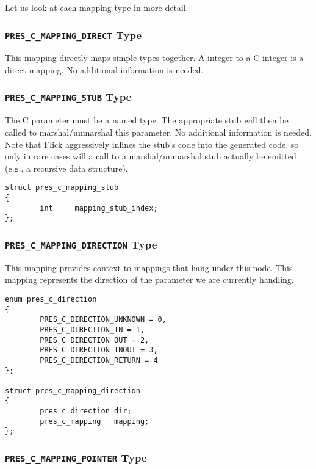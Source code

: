 Let us look at each mapping type in more detail.

\subsubsection{\texttt{PRES\_C\_MAPPING\_DIRECT} Type}

This mapping directly maps simple types together.  A \MINT{} integer to a C
integer is a direct mapping.  No additional information is needed.

\subsubsection{\texttt{PRES\_C\_MAPPING\_STUB} Type}

The C parameter must be a named type.  The appropriate stub will then be called
to marshal/unmarshal this parameter.  No additional information is needed.
Note that Flick aggressively inlines the stub's code into the generated code,
so only in rare cases will a call to a marshal/unmarshal stub actually be
emitted (e.g., a recursive data structure).

\begin{verbatim}
struct pres_c_mapping_stub
{
        int     mapping_stub_index;
};
\end{verbatim}

\subsubsection{\texttt{PRES\_C\_MAPPING\_DIRECTION} Type}

This mapping provides context to mappings that hang under this node.  This
mapping represents the direction of the parameter we are currently handling.

\begin{verbatim}
enum pres_c_direction
{
        PRES_C_DIRECTION_UNKNOWN = 0,
        PRES_C_DIRECTION_IN = 1,
        PRES_C_DIRECTION_OUT = 2,
        PRES_C_DIRECTION_INOUT = 3,
        PRES_C_DIRECTION_RETURN = 4
};

struct pres_c_mapping_direction
{
        pres_c_direction dir;
        pres_c_mapping   mapping;
};
\end{verbatim}

\subsubsection{\texttt{PRES\_C\_MAPPING\_POINTER} Type}

